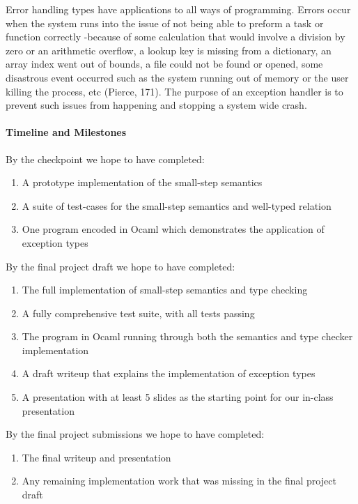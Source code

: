 \documentclass{article}
\begin{document}
Error handling types have applications to all ways of programming. Errors 
occur when the system runs into the issue of not being able to preform a 
task or function correctly -because of some calculation that would involve 
a division by zero or an arithmetic overﬂow, a lookup key is missing from 
a dictionary, an array index went out of bounds, a ﬁle could not be found 
or opened, some disastrous event occurred such as the system running out 
of memory or the user killing the process, etc (Pierce, 171). The purpose
of an exception handler is to prevent such issues from happening and stopping
a system wide crash. 

\paragraph{Timeline and Milestones}

By the checkpoint we hope to have completed:
\begin{enumerate}
\item A prototype implementation of the small-step semantics
\item A suite of test-cases for the small-step semantics and well-typed relation
\item One program encoded in Ocaml which demonstrates the application of exception
      types
\end{enumerate}

\noindent
By the final project draft we hope to have completed:
\begin{enumerate}
\item The full implementation of small-step semantics and type checking
\item A fully comprehensive test suite, with all tests passing
\item The program in Ocaml running through both the semantics and type
  checker implementation
\item A draft writeup that explains the implementation of exception types
\item A presentation with at least 5 slides as the starting point for our
  in-class presentation
\end{enumerate}

\noindent
By the final project submissions we hope to have completed:
\begin{enumerate}
\item The final writeup and presentation
\item Any remaining implementation work that was missing in the final project
  draft
\end{enumerate}
\end{document}
